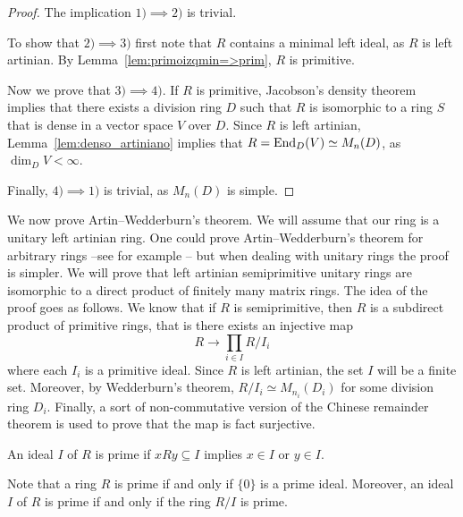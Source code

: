 \begin{proof}
	The implication $1)\implies2)$ is trivial. 
	
	To show that $2)\implies3)$ first note that 
	$R$ contains a minimal left ideal, as $R$ is left artinian. 
	By Lemma~\ref{lem:primoizqmin=>prim}, $R$ is primitive. 

	Now we prove that $3)\implies4)$. If $R$ is primitive, 
	Jacobson's density theorem implies that there exists a division
	ring $D$ such that  
	$R$ is isomorphic to a ring $S$ that is dense in a vector space $V$ over $D$.
	Since $R$ is left artinian, Lemma~\ref{lem:denso_artiniano} implies that  
	$R=\operatorname{End}_D(V)\simeq M_n(D)$, as $\dim_DV<\infty$. 

	Finally, $4)\implies1)$ is trivial, as $M_n(D)$ is simple. 
\end{proof}

We now prove Artin--Wedderburn's theorem. We will assume that our ring
is a unitary left artinian ring. One could prove
Artin--Wedderburn's theorem for arbitrary rings --see for example \cite{MR600654}--  
but when dealing with unitary rings the proof 
is simpler. We will prove
that left artinian semiprimitive unitary rings
are isomorphic to a direct product
of finitely many matrix rings. The idea of the proof goes as follows. 
We know that if 
$R$ is semiprimitive, then $R$ is a subdirect product
of primitive rings, that is  
there exists an injective map
\[
R\to \prod_{i\in I}R/I_i
\]
where each $I_i$ is a primitive ideal. Since $R$ is left artinian, 
the set $I$ will be a finite set. Moreover, 
by Wedderburn's theorem, 
$R/I_i\simeq M_{n_i}(D_i)$ for some division ring $D_i$. Finally,
a sort of non-commutative version of the Chinese remainder theorem
is used to prove that the map is fact surjective. 

\begin{definition}
    An ideal $I$ of $R$ is prime if $xRy\subseteq I$ implies
    $x\in I$ or $y\in I$.
\end{definition}

Note that a ring $R$ is prime if and only if $\{0\}$ is a prime ideal. 
Moreover, 
an ideal $I$ of $R$ is prime if and only if 
the ring $R/I$ is prime. 

